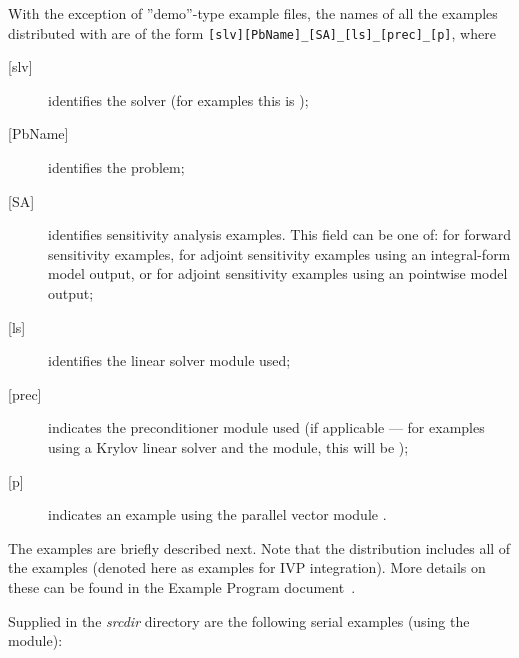 \vspace{0.2in}\noindent
With the exception of ''demo''-type example files, the names of all the examples 
distributed with {\sundials} are of the form \verb![slv][PbName]_[SA]_[ls]_[prec]_[p]!, 
where
\begin{description}
\item [{[slv]}] identifies the solver (for {\idas} examples this is );
\item [{[PbName]}] identifies the problem;
\item [{[SA]}] identifies sensitivity analysis examples. This field can be one
  of:  for forward sensitivity examples,  for adjoint sensitivity
  examples using an integral-form model output, or  for adjoint sensitivity
  examples using an pointwise model output;
\item [{[ls]}] identifies the linear solver module used;
\item [{[prec]}] indicates the {\idas} preconditioner module used
  (if applicable --- for examples using a Krylov linear solver
  and the {\idabbdpre} module, this will be );
\item [{[p]}] indicates an example using the parallel vector module {\nvecp}.
\end{description}

\vspace{0.2in}\noindent
The examples are briefly described next.
Note that the {\idas} distribution includes all of the {\ida} {\C}
examples (denoted here as examples for IVP integration). More details on
these can be found in the {\ida} Example Program document~\cite{ida_ex}.


\vspace{0.2in}\noindent
Supplied in the {\em srcdir} directory are the
following serial examples (using the {\nvecs} module):

